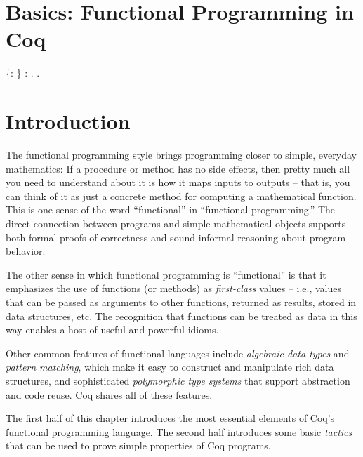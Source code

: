 \documentclass[12pt]{report}
\begin{document}
\begin{coqdoccode}
\end{coqdoccode}
\section{Basics: Functional Programming in Coq}

\begin{coqdoccode}
\coqdocemptyline
\coqdocnoindent
{}  \{: \} : . .\coqdoceol
\coqdocemptyline
\end{coqdoccode}
\section{Introduction}



 The functional programming style brings programming closer to
    simple, everyday mathematics: If a procedure or method has no side
    effects, then pretty much all you need to understand about it is
    how it maps inputs to outputs -- that is, you can think of it as
    just a concrete method for computing a mathematical function.
    This is one sense of the word ``functional'' in ``functional
    programming.''  The direct connection between programs and simple
    mathematical objects supports both formal proofs of correctness
    and sound informal reasoning about program behavior.


    The other sense in which functional programming is ``functional'' is
    that it emphasizes the use of functions (or methods) as
    \textit{first-class} values -- i.e., values that can be passed as
    arguments to other functions, returned as results, stored in data
    structures, etc.  The recognition that functions can be treated as
    data in this way enables a host of useful and powerful idioms.


    Other common features of functional languages include \textit{algebraic
    data types} and \textit{pattern matching}, which make it easy to construct
    and manipulate rich data structures, and sophisticated
    \textit{polymorphic type systems} that support abstraction and code
    reuse.  Coq shares all of these features.


    The first half of this chapter introduces the most essential
    elements of Coq's functional programming language.  The second
    half introduces some basic \textit{tactics} that can be used to prove
    simple properties of Coq programs.
\begin{coqdoccode}
\coqdocemptyline
\end{coqdoccode}
\end{document}
